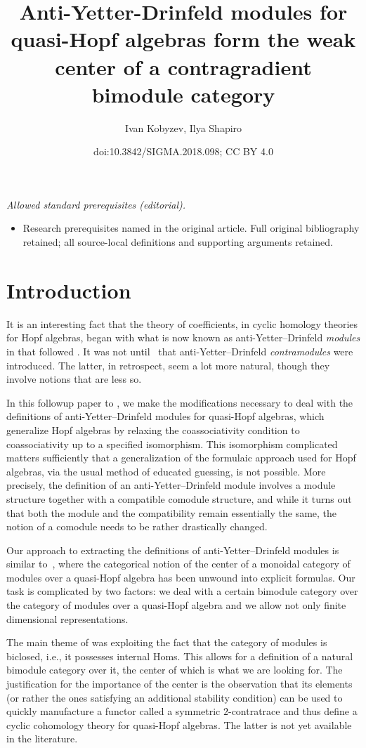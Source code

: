 \documentclass[10pt,a4paper]{amsart}
\title{Anti-Yetter-Drinfeld modules for quasi-Hopf algebras form the weak center of a contragradient bimodule category}
\author{Ivan Kobyzev, Ilya Shapiro}
\date{doi:10.3842/SIGMA.2018.098; CC BY 4.0}
\numberwithin{equation}{section}
\begin{document}
\maketitle
\noindent\textit{Allowed standard prerequisites (editorial).}\begin{itemize}
\item Research prerequisites named in the original article. Full original bibliography retained; all source-local definitions and supporting arguments retained.
\end{itemize}\medskip
\section{Introduction}

It is an interesting fact that the theory of coefficients, in cyclic homology theories for Hopf algebras, began with what is now known as anti-Yetter--Drinfeld \emph{modules} in \cite{hkrs1, hkrs2, js} that followed \cite{CM98, CM99}. It was not until~\cite{contra} that anti-Yetter--Drinfeld \emph{contramodules} were introduced. The latter, in retrospect, seem a lot more natural, though they involve notions that are less so.

In this followup paper to \cite{sk}, we make the modifications necessary to deal with the definitions of anti-Yetter--Drinfeld modules for quasi-Hopf algebras, which generalize Hopf algebras by relaxing the coassociativity condition to coassociativity up to a specified isomorphism. This isomorphism complicated matters sufficiently that a generalization of the formulaic approach used for Hopf algebras, via the usual method of educated guessing, is not possible. More precisely, the definition of an anti-Yetter--Drinfeld module involves a module structure together with a compatible comodule structure, and while it turns out that both the module and the compatibility remain essentially the same, the notion of a comodule needs to be rather drastically changed.

Our approach to extracting the definitions of anti-Yetter--Drinfeld modules is similar to~\cite{majid}, where the categorical notion of the center of a monoidal category of modules over a quasi-Hopf algebra has been unwound into explicit formulas. Our task is complicated by two factors: we deal with a certain bimodule category over the category of modules over a quasi-Hopf algebra and we allow not only finite dimensional representations.

The main theme of \cite{sk} was exploiting the fact that the category of modules is biclosed, i.e., it possesses internal Homs. This allows for a definition of a natural bimodule category over it, the center of which is what we are looking for. The justification for the importance of the center is the observation that its elements (or rather the ones satisfying an additional stability condition) can be used to quickly manufacture a functor called a symmetric $2$-contratrace \cite{hks} and thus define a cyclic cohomology theory for quasi-Hopf algebras. The latter is not yet available in the literature.
\end{document}
